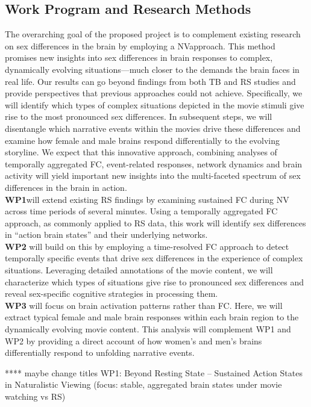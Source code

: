 \documentclass[11pt,a4paper]{article}
\begin{document}
\subsection*{Work Program and Research Methods}
The overarching goal of the proposed project is to complement existing research on sex differences in the brain by 
employing a NVapproach. This method promises new insights into sex differences in brain responses to complex, 
dynamically evolving situations—much closer to the demands the brain faces in real life. Our results can go beyond 
findings from both TB and RS studies and provide perspectives that previous approaches could not achieve. 
Specifically, we will identify which types of complex situations depicted in the movie stimuli give rise to the 
most pronounced sex differences. In subsequent steps, we will disentangle which narrative events within the 
movies drive these differences and examine how female and male brains respond differentially to the evolving storyline. 
We expect that this innovative approach, combining analyses of temporally aggregated 
FC, event-related responses, network dynamics and brain activity will yield important new insights into 
the multi-faceted spectrum of sex differences in the brain in action.\\
\textbf{WP1}will extend existing RS findings by examining sustained FC during NV across time periods of several 
minutes. Using a temporally aggregated FC approach, as commonly applied to RS data, this work will identify 
sex differences in “action brain states” and their underlying networks.\\
\textbf{WP2} will build on this by employing a time-resolved FC approach to detect temporally specific events 
that drive sex differences in the experience of complex situations. Leveraging detailed annotations of the 
movie content, we will characterize which types of situations give rise to pronounced sex differences and 
reveal sex-specific cognitive strategies in processing them.\\
\textbf{WP3} will focus on brain activation patterns rather than FC. Here, we will extract typical female 
and male brain responses within each brain region to the dynamically evolving movie content. This analysis will 
complement WP1 and WP2 by providing a direct account of how women's and men's brains differentially respond 
to unfolding narrative events.

**** maybe change titles
WP1: Beyond Resting State – Sustained Action States in Naturalistic Viewing
(focus: stable, aggregated brain states under movie watching vs RS)
\end{document}
